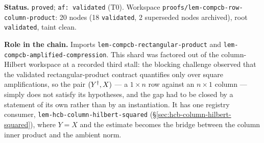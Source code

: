 \medskip
\noindent\textbf{Status.} \texttt{proved}; \texttt{af: validated} (T0). Workspace
\texttt{proofs/lem-compcb-row-column-product}: 20 nodes (18 \texttt{validated}, 2
superseded nodes archived), root \texttt{validated}, taint clean.

\noindent\textbf{Role in the chain.} Imports
\texttt{lem-compcb-rectangular-product} and
\texttt{lem-compcb-amplified-compression}. This shard was factored out of the
column-Hilbert workspace at a recorded third stall: the blocking challenge observed that
the validated rectangular-product contract quantifies only over square amplifications, so
the pair $(Y^{\dagger},X)$ --- a $1\times n$ row against an $n\times1$ column --- simply does not
satisfy its hypotheses, and the gap had to be closed by a statement of its own rather than
by an instantiation. It has one registry consumer,
\texttt{lem-hcb-column-hilbert-squared}
(\S\ref{sec:hcb-column-hilbert-squared}), where $Y=X$ and the estimate becomes the bridge
between the column inner product and the ambient norm.

